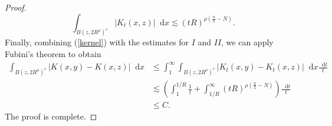 \documentclass[12pt, reqno]{amsart}
\theoremstyle{definition}
\theoremstyle{remark}
\numberwithin{equation}{section}
\newcommand*\diff{\mathop{}\!\mathrm{d}}
\begin{document}
\begin{proof}
\begin{equation*}
       \int_{B(z,2R^\rho)^c}|K_t(x,z)|\diff{x}\lesssim (tR)^{\rho(\frac{n}{2}-N)}.
   \end{equation*}
    Finally, combining (\ref{kernel}) with the estimates for $I$ and $II$, we can apply Fubini’s theorem to obtain 
   \begin{equation*}
   \begin{aligned}
        \int_{B(z, 2R^\rho)^c}|K(x,y)-K(x,z)|\diff{x}&\leq\int_{1}^{\infty}\int_{B(z, 2R^\rho)^c}|K_t(x,y)-K_t(x,z)|\diff{x}\frac{\diff{t}}{t}\\
       &\lesssim\left(\int_{1}^{1/R}\frac{1}{t}+\int_{1/R}^{\infty}(tR)^{\rho(\frac{n}{2}-N)}\right)\frac{\diff{t}}{t}\\
       &\leq C. 
   \end{aligned}
   \end{equation*}
   The proof is complete. 
\end{proof}
\end{document}
